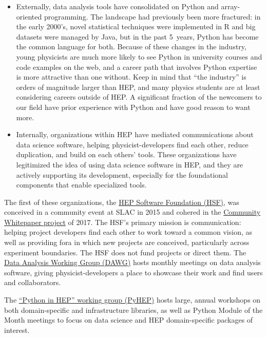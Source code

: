 \documentclass{article}
\begin{document}
\begin{itemize}
\item Externally, data analysis tools have consolidated on Python and array-oriented programming. The landscape had previously been more fractured: in the early 2000's, novel statistical techniques were implemented in R and big datasets were managed by Java, but in the past 5~years, Python has become the common language for both. Because of these changes in the industry, young physicists are much more likely to see Python in university courses and code examples on the web, and a career path that involves Python expertise is more attractive than one without. Keep in mind that ``the industry'' is orders of magnitude larger than HEP, and many physics students are at least considering careers outside of HEP. A significant fraction of the newcomers to our field have prior experience with Python and have good reason to want more.

\item Internally, organizations within HEP have mediated communications about data science software, helping physicist-developers find each other, reduce duplication, and build on each others' tools. These organizations have legitimized the idea of using data science software in HEP, and they are actively supporting its development, especially for the foundational components that enable specialized tools.
\end{itemize}

The first of these organizations, the \href{https://hepsoftwarefoundation.org/}{HEP Software Foundation (HSF)}, was conceived in a community event at SLAC in 2015 and cohered in the \href{https://hepsoftwarefoundation.org/organization/cwp.html}{Community Whitepaper project} of 2017. The HSF's primary mission is communication: helping project developers find each other to work toward a common vision, as well as providing fora in which new projects are conceived, particularly across experiment boundaries. The HSF does not fund projects or direct them. The \href{https://hepsoftwarefoundation.org/workinggroups/dataanalysis.html}{Data Analysis Working Group (DAWG)} hosts monthly meetings on data analysis software, giving physicist-developers a place to showcase their work and find users and collaborators.

The \href{https://hepsoftwarefoundation.org/workinggroups/pyhep.html}{``Python in HEP'' working group (PyHEP)} hosts large, annual workshops on both domain-specific and infrastructure libraries, as well as Python Module of the Month meetings to focus on data science and HEP domain-specific packages of interest.
\end{document}
